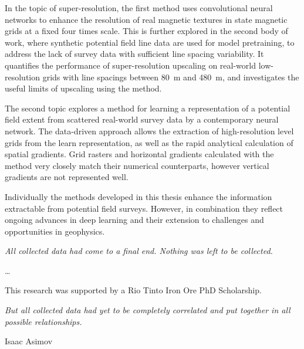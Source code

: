 \documentclass[12pt,a4paper]{report} %
\begin{document}
In the topic of super-resolution, the first method uses convolutional neural networks to enhance the resolution of real magnetic textures in state magnetic grids at a fixed four times scale.
This is further explored in the second body of work, where synthetic potential field line data are used for model pretraining, to address the lack of survey data with sufficient line spacing variability.
It quantifies the performance of super-resolution upscaling on real-world low-resolution grids with line spacings between \SI{80}{\m} and \SI{480}{\m}, and investigates the useful limits of upscaling using the method.

The second topic explores a method for learning a representation of a potential field extent from scattered real-world survey data by a contemporary neural network.
The data-driven approach allows the extraction of high-resolution level grids from the learn representation, as well as the rapid analytical calculation of spatial gradients.
Grid rasters and horizontal gradients calculated with the method very closely match their numerical counterparts, however vertical gradients are not represented well.

Individually the methods developed in this thesis enhance the information extractable from potential field surveys.
However, in combination they reflect ongoing advances in deep learning and their extension to challenges and opportunities in geophysics.

\vfill{}
\epigraph{\emph{All collected data had come to a final end. Nothing was left to be collected.}}{}

\newpage{}
\dots{}

This research was supported by a Rio Tinto Iron Ore PhD Scholarship.

\vfill{}
\epigraph{\emph{But all collected data had yet to be completely correlated and put together in all possible relationships.}}{Isaac Asimov}

\newpage{}
\tableofcontents{}
\listoffigures{}
\end{document}
